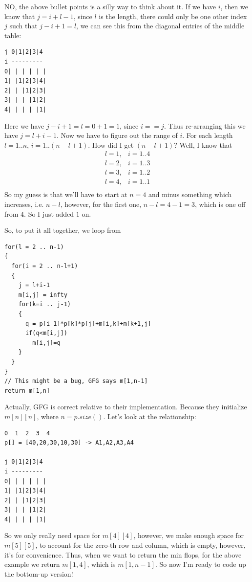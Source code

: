 NO, the above bullet points is a silly way to think about it. If we have
$i$, then we know that $j=i+l-1$, since $l$ is the length, there could only
be one other index $j$ such that $j-i + 1 = l$, we can see this from the
diagonal entries of the middle table:
\begin{lstlisting}[style=raygeneric]
j 0|1|2|3|4
i ---------
0| | | | | |
1| |1|2|3|4|
2| | |1|2|3|
3| | | |1|2|
4| | | | |1|
\end{lstlisting}
Here we have $j-i+1 = l = 0+1 = 1$, since $i==j$. Thus re-arranging this we
have $j=l+i-1$. Now we have to figure out the range of $i$. For each length
$l=1..n$, $i = 1..(n-l+1)$. How did I get $(n-l+1)$? Well, I know that
\begin{align*}
l=1, &i=1..4\\
l=2, &i=1..3\\
l=3, &i=1..2\\
l=4, &i=1..1\\
\end{align*}
So my guess is that we'll have to start at $n=4$ and minus something which 
increases, i.e. $n-l$, however, for the first one, $n-l=4-1=3$, which is one
off from $4$. So I just added $1$ on.

So, to put it all together, we loop from
\begin{lstlisting}[style=pseudostyle,numbers=none]
for(l = 2 .. n-1)
{
  for(i = 2 .. n-l+1)
  {
    j = l+i-1
    m[i,j] = infty
    for(k=i .. j-1)
    {
      q = p[i-1]*p[k]*p[j]+m[i,k]+m[k+1,j]
      if(q<m[i,j])
        m[i,j]=q
    }
  }
}
// This might be a bug, GFG says m[1,n-1]
return m[1,n]
\end{lstlisting}
Actually, GFG is correct relative to their implementation. Because they
initialize $m[n][n]$, where $n=p.size()$. Let's look at the relationship:
\begin{lstlisting}[style=raygeneric]
        0  1  2  3  4
p[] = [40,20,30,10,30] -> A1,A2,A3,A4

j 0|1|2|3|4
i ---------
0| | | | | |
1| |1|2|3|4|
2| | |1|2|3|
3| | | |1|2|
4| | | | |1|
\end{lstlisting}
So we only really need space for $m[4][4]$, however, we make enough space
for $m[5][5]$, to account for the zero-th row and column, which is empty,
however, it's for convenience. Thus, when we want to return the min flops,
for the above example we return $m[1,4]$, which is $m[1,n-1]$. So now I'm
ready to code up the bottom-up version!

